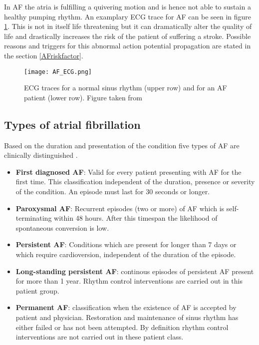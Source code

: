 \documentclass[type=dr, dr=rernat, accentcolor=tud7b,colorbacktitle, bigchapter, openright, twoside, 12pt ]{tudthesis}
\begin{document}
In AF the atria is fulfilling a quivering motion and is hence not able to sustain a healthy pumping rhythm. An examplary ECG trace for AF 
can be seen in figure \ref{af_ecg}. 
This is not in itself life threatening but it can dramatically alter the quality of life and drastically increases the risk of the patient 
of suffering a stroke. Possible reasons and triggers for this abnormal action potential propagation are stated in the section \ref{AFriskfactor}.

\begin{figure}[H]
\begin{center}
\texttt{[image: AF\_ECG.png]}
\caption{ECG traces for a normal sinus rhythm (upper row) and for an AF patient (lower row). Figure taken from \cite{afib}}
\label{af_ecg}
\end{center}
\end{figure}

\newpage
\subsection{Types of atrial fibrillation}

Based on the duration and presentation of the condition five types of AF are clinically distinguished \cite{ESC10} \cite{CE09}.

\begin{itemize} 
 \item[] \textbf{First diagnosed AF}: Valid for every patient presenting with AF for the first time. This classification independent of the 
 duration, presence or severity of the condition. An episode must last for 30 seconds or longer.
 \item[] \textbf{Paroxysmal AF}: Recurrent episodes (two or more) of AF which is self-terminating within 48 hours. After this timespan the 
 likelihood of spontaneous conversion is low.
 \item[] \textbf{Persistent AF}: Conditions which are present for longer than 7 days or which require cardioversion, independent of the 
 duration of the episode. 
 \item[] \textbf{Long-standing persistent AF}: continous episodes of persistent AF present for more than 1 year. Rhythm control 
 interventions  are carried out in this patient group. 
 \item[] \textbf{Permanent AF}: classification when the existence of AF is accepted by patient and physician. Restoration and maintenance
 of sinus rhythm has either failed or has not been attempted. By definition rhythm control interventions are not carried out in these 
 patient class.  
\end{itemize}
\end{document}
